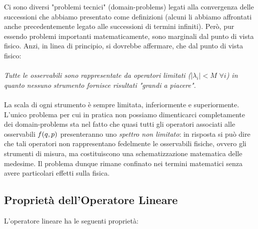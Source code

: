 \begin{myapprf}

	Ci sono diversi "problemi tecnici" (domain-problems) legati alla convergenza delle successioni che abbiamo presentato come definizioni (alcuni li abbiamo affrontati anche precedentemente legato alle successioni di termini infiniti). Però, pur essendo problemi importanti matematicamente, sono marginali dal punto di vista fisico. Anzi, in linea di principio, si dovrebbe affermare, che dal punto di vista fisico:
	\\
	\\
	\textit{Tutte le osservabili sono rappresentate da operatori limitati ($ |\lambda_i| < M \, \,\forall i $) in quanto nessuno strumento fornisce risultati "grandi a piacere".} 
	\\
	\\
	La scala di ogni strumento è sempre limitata, inferiormente e superiormente. L'unico problema per cui in pratica non possiamo dimenticarci completamente dei domain-problems sta nel fatto che quasi tutti gli operatori associati alle osservabili $f\qty(q, p)$ presenteranno uno \textit{spettro non limitato}: in risposta si può dire che tali operatori non rappresentano fedelmente le osservabili fisiche, ovvero gli strumenti di misura, ma costituiscono una schematizzazione matematica delle medesime. Il problema dunque rimane confinato nei termini matematici senza avere particolari effetti sulla fisica.
				
\end{myapprf}

\subsection{Proprietà dell'Operatore Lineare}

	L'operatore lineare ha le seguenti proprietà:
	
